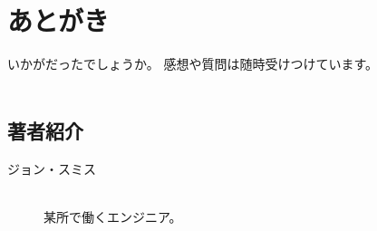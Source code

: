 \chapter{あとがき}
\label{chap:chap99-postscript}

いかがだったでしょうか。
感想や質問は随時受けつけています。
\\{}
\\{}

\section*{著者紹介}
\label{sec:-1}

\begin{description}
\item[ジョン・スミス] \mbox{} \\
某所で働くエンジニア。
\end{description}
